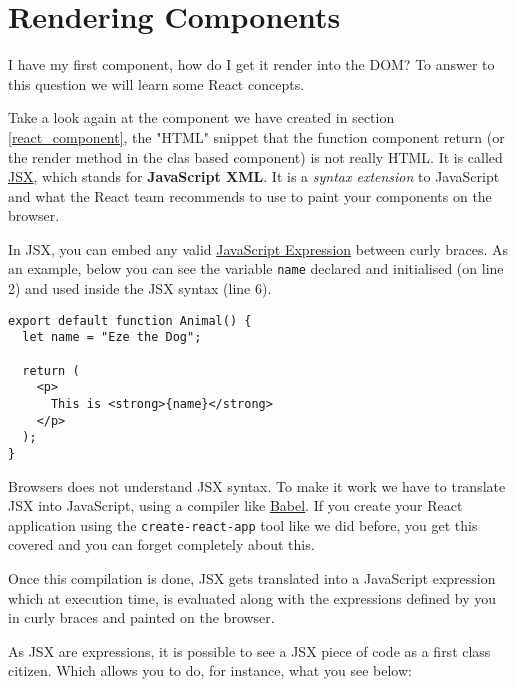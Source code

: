 \documentclass[a4paper, oneside, titlepage, 12pt]{book}
\begin{document}
\section{Rendering Components}

I have my first component, how do I get it render into the DOM? To answer to this question we will learn some React concepts.

Take a look again at the component we have created in section \ref{react_component}, the "HTML" snippet that the function component return (or the render method in the clas based component) is not really HTML. It is called \href{https://reactjs.org/docs/introducing-jsx.html}{JSX}, which stands for \textbf{JavaScript XML}. It is a \textit{syntax extension} to JavaScript and what the React team recommends to use to paint your components on the browser.
\newline 

In JSX, you can embed any valid \href{https://developer.mozilla.org/en-US/docs/Web/JavaScript/Guide/Expressions_and_Operators#expressions}{JavaScript Expression} between curly braces. As an example, below you can see the variable \texttt{name} declared and initialised (on line 2) and used inside the JSX syntax (line 6). 

\begin{verbatim}
export default function Animal() {
  let name = "Eze the Dog";

  return (
    <p>
      This is <strong>{name}</strong>
    </p>
  );
}
\end{verbatim}

Browsers does not understand JSX syntax. To make it work we have to translate JSX into JavaScript, using a compiler like \href{https://babeljs.io/}{Babel}. If you create your React application using the \texttt{create-react-app} tool like we did before, you get this covered and you can forget completely about this.
\newline 

Once this compilation is done, JSX gets translated into a JavaScript expression which at execution time, is evaluated along with the expressions defined by you in curly braces and painted on the browser.
\newline 

As JSX are expressions, it is possible to see a JSX piece of code as a first class citizen. Which allows you to do, for instance, what you see below:
\end{document}
